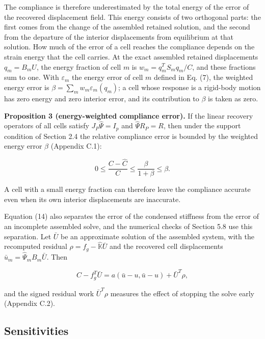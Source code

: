 \documentclass[preprint,12pt,authoryear]{elsarticle}
\begin{document}
The compliance is therefore underestimated by the total energy of the error of the recovered displacement field. This energy consists of two orthogonal parts: the first comes from the change of the assembled retained solution, and the second from the departure of the interior displacements from equilibrium at that solution. How much of the error of a cell reaches the compliance depends on the strain energy that the cell carries. At the exact assembled retained displacements \(q_m=B_mU\), the energy fraction of cell \(m\) is \(w_m=q_m^TS_mq_m/C\), and these fractions sum to one. With \(\varepsilon_m\) the energy error of cell \(m\) defined in Eq. (7), the weighted energy error is \(\beta=\sum_mw_m\varepsilon_m(q_m)\); a cell whose response is a rigid-body motion has zero energy and zero interior error, and its contribution to \(\beta\) is taken as zero.

\textbf{Proposition 3 (energy-weighted compliance error).} If the linear recovery operators of all cells satisfy \(J_P\widehat\Psi=I_p\) and \(\widehat\Psi R_P=R\), then under the support condition of Section 2.4 the relative compliance error is bounded by the weighted energy error \(\beta\) (Appendix C.1):

\[
\boxed{0\le\frac{C-\widehat C}{C}\le\frac{\beta}{1+\beta}\le\beta.}
\tag{15}
\]

A cell with a small energy fraction can therefore leave the compliance accurate even when its own interior displacements are inaccurate.

Equation (14) also separates the error of the condensed stiffness from the error of an incomplete assembled solve, and the numerical checks of Section 5.8 use this separation. Let \(\bar U\) be an approximate solution of the assembled system, with the recomputed residual \(\rho=f_g-\widehat{\mathbb K}\bar U\) and the recovered cell displacements \(\bar u_m=\widehat\Psi_mB_m\bar U\). Then

\[
C-f_g^T\bar U=a(\bar u-u,\bar u-u)+\bar U^T\rho,
\tag{16}
\]

and the signed residual work \(\bar U^T\rho\) measures the effect of stopping the solve early (Appendix C.2).

\subsection{Sensitivities}
\end{document}
